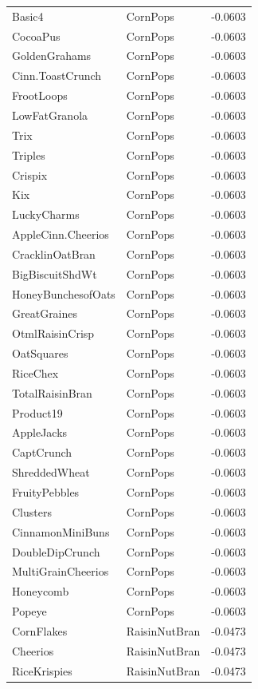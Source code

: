 \begin{table}[!htbp]
\begin{tabular}{lll}
Basic4 & CornPops & -0.0603
\\
CocoaPus & CornPops & -0.0603
\\
GoldenGrahams & CornPops & -0.0603
\\
Cinn.ToastCrunch & CornPops & -0.0603
\\
FrootLoops & CornPops & -0.0603
\\
LowFatGranola & CornPops & -0.0603
\\
Trix & CornPops & -0.0603
\\
Triples & CornPops & -0.0603
\\
Crispix & CornPops & -0.0603
\\
Kix & CornPops & -0.0603
\\
LuckyCharms & CornPops & -0.0603
\\
AppleCinn.Cheerios & CornPops & -0.0603
\\
CracklinOatBran & CornPops & -0.0603
\\
BigBiscuitShdWt & CornPops & -0.0603
\\
HoneyBunchesofOats & CornPops & -0.0603
\\
GreatGraines & CornPops & -0.0603
\\
OtmlRaisinCrisp & CornPops & -0.0603
\\
OatSquares & CornPops & -0.0603
\\
RiceChex & CornPops & -0.0603
\\
TotalRaisinBran & CornPops & -0.0603
\\
Product19 & CornPops & -0.0603
\\
AppleJacks & CornPops & -0.0603
\\
CaptCrunch & CornPops & -0.0603
\\
ShreddedWheat & CornPops & -0.0603
\\
FruityPebbles & CornPops & -0.0603
\\
Clusters & CornPops & -0.0603
\\
CinnamonMiniBuns & CornPops & -0.0603
\\
DoubleDipCrunch & CornPops & -0.0603
\\
MultiGrainCheerios & CornPops & -0.0603
\\
Honeycomb & CornPops & -0.0603
\\
Popeye & CornPops & -0.0603
\\
CornFlakes & RaisinNutBran & -0.0473
\\
Cheerios & RaisinNutBran & -0.0473
\\
RiceKrispies & RaisinNutBran & -0.0473
\\

\end{tabular}
\end{table}
